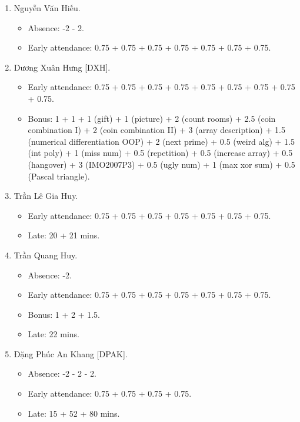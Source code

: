 \documentclass{article}
\begin{document}
\begin{enumerate}
	\item {\sc Nguyễn Văn Hiếu.}
	\begin{itemize}
		\item Absence: -2 - 2.
		\item Early attendance: 0.75 + 0.75 + 0.75 + 0.75 + 0.75 + 0.75 + 0.75.
	\end{itemize}
	\item {\sc Dương Xuân Hưng [DXH].}
	\begin{itemize}
		\item Early attendance: 0.75 + 0.75 + 0.75 + 0.75 + 0.75 + 0.75 + 0.75 + 0.75 + 0.75.
		\item Bonus: 1 + 1 + 1 (gift) + 1 (picture) + 2 (count rooms) + 2.5 (coin combination I) + 2 (coin combination II) + 3 (array description) + 1.5 (numerical differentiation OOP) + 2 (next prime) + 0.5 (weird alg) + 1.5 (int poly) + 1 (miss num) + 0.5 (repetition) + 0.5 (increase array) + 0.5 (hangover) + 3 (IMO2007P3) + 0.5 (ugly num) + 1 (max xor sum) + 0.5 (Pascal triangle).
	\end{itemize}
	\item {\sc Trần Lê Gia Huy.}
	\begin{itemize}
		\item Early attendance: 0.75 + 0.75 + 0.75 + 0.75 + 0.75 + 0.75 + 0.75.
        \item Late: 20 + 21 mins.
	\end{itemize}
	\item {\sc Trần Quang Huy.}
	\begin{itemize}
		\item Absence: -2.
		\item Early attendance: 0.75 + 0.75 + 0.75 + 0.75 + 0.75 + 0.75 + 0.75.
        \item Bonus: 1 + 2 + 1.5.
        \item Late: 22 mins.
	\end{itemize}
	\item {\sc Đặng Phúc An Khang [DPAK].}
	\begin{itemize}
        \item Absence: -2 - 2 - 2.
		\item Early attendance: 0.75 + 0.75 + 0.75 + 0.75.
		\item Late: 15 + 52 + 80 mins.

\end{itemize}
\end{enumerate}
\end{document}
